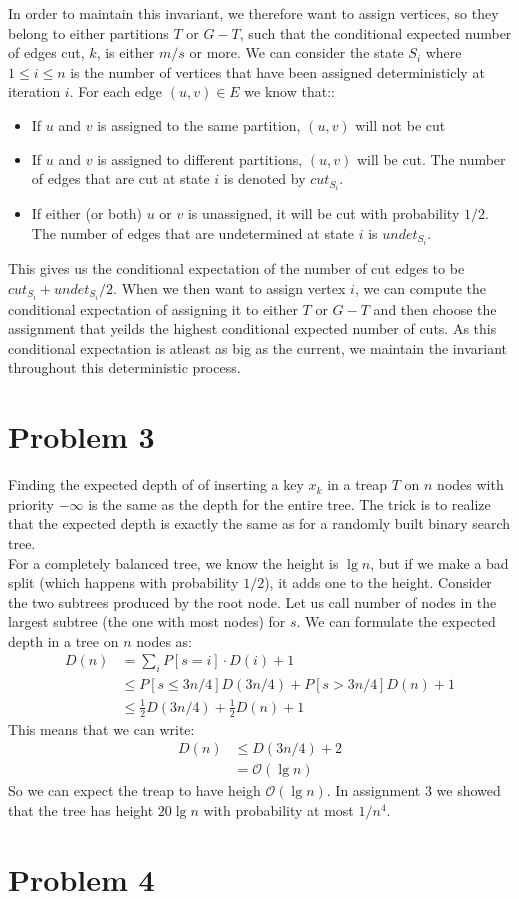 \documentclass[a4paper, fleqn]{article}
\begin{document}
In order to maintain this invariant, we therefore want to assign vertices, so they belong to either partitions $T$ or $G-T$, such that the conditional expected number of edges cut, $k$, is either $m/s$ or more. We can consider the state $S_i$ where $1\leq i\leq n$ is the number of vertices that have been assigned deterministicly at iteration $i$. For each edge $(u,v)\in E$ we know that::
\begin{itemize}
  \item If $u$ and $v$ is assigned to the same partition, $(u,v)$ will not be cut
  \item If $u$ and $v$ is assigned to different partitions, $(u,v)$ will be cut. The number of edges that are cut at state $i$ is denoted by $cut_{S_i}$.
  \item If either (or both) $u$ or $v$ is unassigned, it will be cut with probability $1/2$. The number of edges that are undetermined at state $i$ is $undet_{S_i}$.
\end{itemize}
This gives us the conditional expectation of the number of cut edges to be $cut_{S_i}+undet_{S_i}/2$. When we then want to assign vertex $i$, we can compute the conditional expectation of assigning it to either $T$ or $G-T$ and then choose the assignment that yeilds the highest conditional expected number of cuts. As this conditional expectation is atleast as big as the current, we maintain the invariant throughout this deterministic process.

\section*{Problem 3}
Finding the expected depth of of inserting a key $x_k$ in a treap $T$ on $n$ nodes with priority $-\infty$ is the same as the depth for the entire tree. The trick is to realize that the expected depth is exactly the same as for a randomly built binary search tree. \\
For a completely balanced tree, we know the height is $\lg n$, but if we make a bad split (which happens with probability $1/2$), it adds one to the height. Consider the two subtrees produced by the root node. Let us call number of nodes in the largest subtree (the one with most nodes) for $s$.  We can formulate the expected depth in a tree on $n$ nodes as:
\begin{align*}
  D(n)&=\sum_i P[s=i]\cdot D(i)+1 \\
  &\leq P[s\leq 3n/4]D(3n/4)+P[s>3n/4]D(n)+1 \\
  &\leq \frac{1}{2}D(3n/4)+\frac{1}{2}D(n)+1
\end{align*}
This means that we can write:
\begin{align*}
  D(n)&\leq D(3n/4)+2 \\
      &=\mathcal{O}(\lg n)
\end{align*}
So we can expect the treap to have heigh $\mathcal{O}(\lg n)$. In assignment $3$ we showed that the tree has height $20\lg n$ with probability at most $1/n^4$.

\section*{Problem 4}
\end{document}
